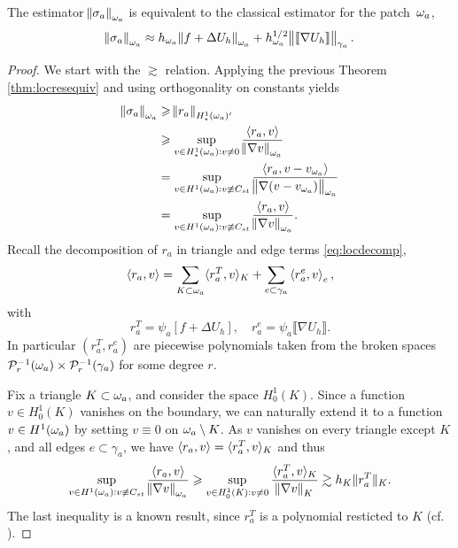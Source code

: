 \documentclass[thesis.tex]{subfiles}
\begin{document}
\begin{lem}
  \label{lem:starequiv}
  The estimator $\norm{\sigma_a}_{\omega_a}$ is equivalent to the classical estimator for the patch~$\omega_a$, 
  \[
    \norm{\sigma_a}_{\omega_a} \approx h_{\omega_a}\norm{f + \Delta U_h}_{\omega_a} + h^{1/2}_{\omega_a} \norm{\llbracket \nabla U_h  \rrbracket}_{\gamma_a}.
  \]
\end{lem}
\begin{proof}
  We start with the $\gtrsim$ relation.  Applying the previous Theorem \ref{thm:locresequiv} and using orthogonality on constants yields  
  \begin{align*}
    \norm{\sigma_a}_{\omega_a} &\geqslant \norm{r_a}_{H^1_\star(\omega_a)'} \\
    &\geqslant \sup_{v \in H^1_\star(\omega_a) : v \ne 0} { \left \langle r_a, v \right \rangle \over \norm{\nabla v}_{\omega_a}} \\
    &= \sup_{v \in H^1(\omega_a) : v \not \equiv C_{st}} { \left \langle r_a, v - v_{\omega_a} \right \rangle \over \norm{\nabla (v - v_{\omega_a})}_{\omega_a}} \\
          &= \sup_{v \in H^1(\omega_a) : v \not \equiv C_{st}} { \left \langle r_a, v \right \rangle \over \norm{\nabla v}_{\omega_a}}.
  \end{align*}
  Recall the decomposition of $r_a$ in triangle and edge terms \eqref{eq:locdecomp},
  \[
    \left \langle r_a,v \right \rangle = \sum_{K\subset \omega_a} \langle{r^T_a, v}\rangle_K + \sum_{e \subset \gamma_a} \left \langle r^e_a, v \right \rangle_e,
  \]
  with 
  \[
   r^T_a = \psi_a \left[ f + \Delta U_h \right], \quad r^e_a = \psi_a \llbracket \nabla U_h \rrbracket.
  \]
  In particular $(r^T_a, r^e_a)$ are piecewise polynomials taken from the  broken spaces $\mathcal{P}_r^{-1}(\omega_a)\times \mathcal{P}_r^{-1}(\gamma_a)$ for some degree $r$.

  Fix a triangle $K \subset \omega_a$, and consider the space $H_0^1(K)$. Since a function $v \in H_0^1(K)$ vanishes on the boundary, 
  we can naturally extend it to a function $v \in H^1(\omega_a)$ by setting $v \equiv 0$ on $\omega_a \setminus K$. As $v$
  vanishes on every triangle except $K$, and all edges $e \subset \gamma_a$, we have $\left \langle r_a, v \right \rangle = \langle{r_a^T, v}\rangle_K$ and thus
  \[
         \sup_{v \in H^1(\omega_a) : v \not \equiv C_{st}} { \left \langle r_a, v \right \rangle \over \norm{\nabla v}_{\omega_a}} 
         \geqslant \sup_{v \in H_0^1(K) : v \ne 0} { \langle{r^T_a, v}\rangle_K \over \norm{\nabla v}_{K}}
         \gtrsim h_K \|{r^T_a}\|_K.
  \]
  The last inequality is a known result, since $r^T_a$ is a polynomial resticted to $K$ (cf. \cite[Ex~9.x.5]{brenner}).
  

\end{proof}
\end{document}
